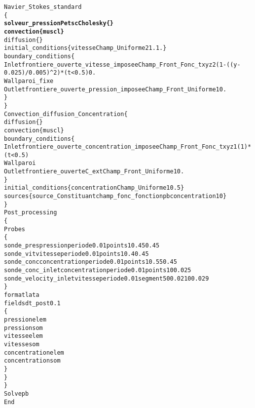 \begin{alltt}
    Navier_Stokes_standard
    \{
        {\bf{solveur_pression Petsc Cholesky \{ \} }}
        {\bf{convection \{ muscl \} }}
        diffusion \{ \}
        initial_conditions \{ vitesse Champ_Uniforme 2 1. 1. \}
        boundary_conditions \{
            Inlet   frontiere_ouverte_vitesse_imposee Champ_Front_Fonc_txyz 2 (1-((y-0.025)/0.005)^2)*(t<0.5)  0.
            Wall    paroi_fixe
            Outlet  frontiere_ouverte_pression_imposee Champ_Front_Uniforme 1 0.
        \}
    \}
    Convection_diffusion_Concentration \{
        diffusion \{ \}
        convection \{ muscl \}
        boundary_conditions \{
            Inlet   frontiere_ouverte_concentration_imposee Champ_Front_Fonc_txyz 1 (1)*(t<0.5)
            Wall    paroi
            Outlet  frontiere_ouverte C_ext Champ_Front_Uniforme 1 0.
        \}
        initial_conditions \{ concentration Champ_Uniforme 1 0.5 \}
        sources \{ source_Constituant champ_fonc_fonction pb concentration 1 0 \}
    \}
    Post_processing
    \{
        Probes
        \{
            sonde_pres pression periode 0.01 points 1 0.45 0.45
            sonde_vit  vitesse periode 0.01 points 1 0.4 0.45
            sonde_conc concentration periode 0.01 points 1 0.55 0.45
            sonde_conc_inlet     concentration periode 0.01 points 1 0 0.025
            sonde_velocity_inlet vitesse periode 0.01 segment 5 0 0.021 0 0.029
        \}
        format lata
        fields dt_post 0.1
        \{
            pression elem
            pression som
            vitesse elem
            vitesse som
            concentration elem
            concentration som
        \}
    \}
\}
Solve pb
End
\end{alltt}
